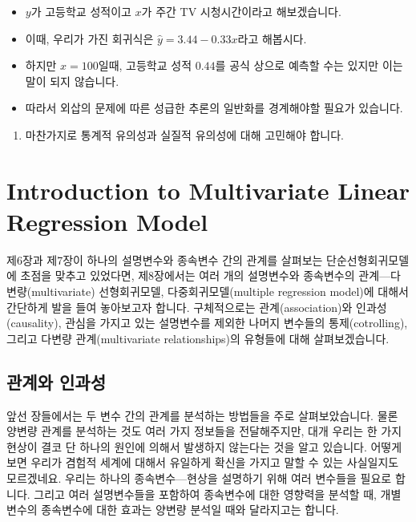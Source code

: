 \documentclass[]{book}
\providecommand{\tightlist}{%
  \setlength{\itemsep}{0pt}\setlength{\parskip}{0pt}}
\begin{document}
\begin{itemize}
\tightlist
\item
  \(y\)가 고등학교 성적이고 \(x\)가 주간 TV 시청시간이라고 해보겠습니다.
\item
  이때, 우리가 가진 회귀식은 \(\hat{y} = 3.44 - 0.33x\)라고 해봅시다.
\item
  하지만 \(x=100\)일때, 고등학교 성적 \(0.44\)를 공식 상으로 예측할 수는 있지만 이는 말이 되지 않습니다.
\item
  따라서 외삽의 문제에 따른 성급한 추론의 일반화를 경계해야할 필요가 있습니다.
\end{itemize}

\begin{enumerate}
\def\labelenumi{\arabic{enumi}.}
\setcounter{enumi}{3}
\tightlist
\item
  마찬가지로 통계적 유의성과 실질적 유의성에 대해 고민해야 합니다.
\end{enumerate}

\hypertarget{introduction-to-multivariate-linear-regression-model}{%
\chapter{Introduction to Multivariate Linear Regression Model}\label{introduction-to-multivariate-linear-regression-model}}

제6장과 제7장이 하나의 설명변수와 종속변수 간의 관계를 살펴보는 단순선형회귀모델에 초점을 맞추고 있었다면, 제8장에서는 여러 개의 설명변수와 종속변수의 관계---다변량(multivariate) 선형회귀모델, 다중회귀모델(multiple regression model)에 대해서 간단하게 발을 들여 놓아보고자 합니다. 구체적으로는 관계(association)와 인과성(causality), 관심을 가지고 있는 설명변수를 제외한 나머지 변수들의 통제(cotrolling), 그리고 다변량 관계(multivariate relationships)의 유형들에 대해 살펴보겠습니다.

\hypertarget{uxad00uxacc4uxc640-uxc778uxacfcuxc131}{%
\section{관계와 인과성}\label{uxad00uxacc4uxc640-uxc778uxacfcuxc131}}

앞선 장들에서는 두 변수 간의 관계를 분석하는 방법들을 주로 살펴보았습니다. 물론 양변량 관계를 분석하는 것도 여러 가지 정보들을 전달해주지만, 대개 우리는 한 가지 현상이 결코 단 하나의 원인에 의해서 발생하지 않는다는 것을 알고 있습니다. 어떻게 보면 우리가 겸험적 세계에 대해서 유일하게 확신을 가지고 말할 수 있는 사실일지도 모르겠네요. 우리는 하나의 종속변수---현상을 설명하기 위해 여러 변수들을 필요로 합니다. 그리고 여러 설명변수들을 포함하여 종속변수에 대한 영향력을 분석할 때, 개별 변수의 종속변수에 대한 효과는 양변량 분석일 때와 달라지고는 합니다.
\end{document}
